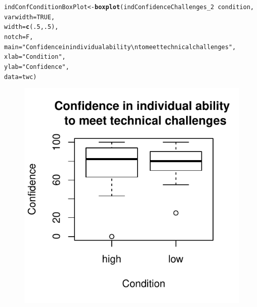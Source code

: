 \documentclass[english]{article}\usepackage[]{graphicx}\usepackage[]{color}
\makeatletter
\def\maxwidth{ %
  \ifdim\Gin@nat@width>\linewidth
    \linewidth
  \else
    \Gin@nat@width
  \fi
}
\newcommand{\hlnum}[1]{\textcolor[rgb]{0.686,0.059,0.569}{#1}}%
\newcommand{\hlstr}[1]{\textcolor[rgb]{0.192,0.494,0.8}{#1}}%
\newcommand{\hlopt}[1]{\textcolor[rgb]{0,0,0}{#1}}%
\newcommand{\hlstd}[1]{\textcolor[rgb]{0.345,0.345,0.345}{#1}}%
\newcommand{\hlkwb}[1]{\textcolor[rgb]{0.69,0.353,0.396}{#1}}%
\newcommand{\hlkwc}[1]{\textcolor[rgb]{0.333,0.667,0.333}{#1}}%
\newcommand{\hlkwd}[1]{\textcolor[rgb]{0.737,0.353,0.396}{\textbf{#1}}}%
\newenvironment{kframe}{%
 \def\at@end@of@kframe{}%
 \ifinner\ifhmode%
  \def\at@end@of@kframe{\end{minipage}}%
  \begin{minipage}{\columnwidth}%
 \fi\fi%
 \def\FrameCommand##1{\hskip\@totalleftmargin \hskip-\fboxsep
 \colorbox{shadecolor}{##1}\hskip-\fboxsep
     \hskip-\linewidth \hskip-\@totalleftmargin \hskip\columnwidth}%
 \MakeFramed {\advance\hsize-\width
   \@totalleftmargin\z@ \linewidth\hsize
   \@setminipage}}%
 {\par\unskip\endMakeFramed%
 \at@end@of@kframe}
\newenvironment{knitrout}{}{} %
\makeatother
\begin{document}
\begin{knitrout}
\color{fgcolor}\begin{kframe}
\begin{alltt}
\hlstd{indConfConditionBoxPlot} \hlkwb{<-} \hlkwd{boxplot}\hlstd{(indConfidenceChallenges_2} \hlopt{~} \hlstd{condition,}
                                        \hlkwc{varwidth} \hlstd{=} \hlnum{TRUE}\hlstd{,}
                                        \hlkwc{width} \hlstd{=} \hlkwd{c}\hlstd{(}\hlnum{.5}\hlstd{,}\hlnum{.5}\hlstd{),}
                                        \hlkwc{notch} \hlstd{= F,}
                                        \hlkwc{main} \hlstd{=} \hlstr{"Confidence in individual ability \textbackslash{}n to meet technical challenges"}\hlstd{,}
                                        \hlkwc{xlab} \hlstd{=} \hlstr{"Condition"}\hlstd{,}
                                        \hlkwc{ylab} \hlstd{=} \hlstr{"Confidence"}\hlstd{,}
                                        \hlkwc{data} \hlstd{= twc)}
\end{alltt}
\end{kframe}\begin{figure}

{\centering \includegraphics[width=\maxwidth]{figure/indConfChallengesBoxplot-1} 

}

\end{figure}


\end{knitrout}
\end{document}
